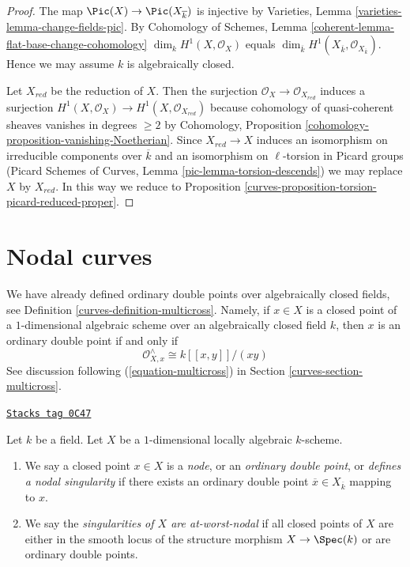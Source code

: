 \begin{proof}

The map $\Pic(X) \to \Pic(X_{\overline{k}})$
is injective by Varieties, Lemma \ref{varieties-lemma-change-fields-pic}.
By Cohomology of Schemes, Lemma \ref{coherent-lemma-flat-base-change-cohomology}
$\dim_k H^1(X, \mathcal{O}_X)$ equals
$\dim_{\overline{k}} H^1(X_{\overline{k}}, \mathcal{O}_{X_{\overline{k}}})$.
Hence we may assume $k$ is algebraically closed.

\medskip\noindent
Let $X_{red}$ be the reduction of $X$. Then the surjection
$\mathcal{O}_X \to \mathcal{O}_{X_{red}}$ induces a surjection
$H^1(X, \mathcal{O}_X) \to H^1(X, \mathcal{O}_{X_{red}})$
because cohomology of quasi-coherent sheaves vanishes in degrees
$\geq 2$ by
Cohomology, Proposition \ref{cohomology-proposition-vanishing-Noetherian}.
Since $X_{red} \to X$ induces an isomorphism on irreducible
components over $\overline{k}$ and an isomorphism on
$\ell$-torsion in Picard groups
(Picard Schemes of Curves, Lemma \ref{pic-lemma-torsion-descends})
we may replace $X$ by $X_{red}$. In this way we reduce to
Proposition \ref{curves-proposition-torsion-picard-reduced-proper}.
\end{proof}

\section{Nodal curves}
\label{curves-section-nodal}
We have already defined ordinary double points over algebraically
closed fields, see Definition \ref{curves-definition-multicross}. Namely,
if $x \in X$ is a closed point of a $1$-dimensional
algebraic scheme over an algebraically closed field $k$, then
$x$ is an ordinary double point if and only if
$$
\mathcal{O}_{X, x}^\wedge \cong k[[x, y]]/(xy)
$$
See discussion following (\ref{equation-multicross}) in
Section \ref{curves-section-multicross}.

\begin{definition}[Nodal]
\label{curves-definition-nodal}
\href{https://stacks.math.columbia.edu/tag/0C47}{\texttt{Stacks tag 0C47}}

Let $k$ be a field. Let $X$ be a $1$-dimensional locally algebraic $k$-scheme.
\begin{enumerate}
\item We say a closed point $x \in X$ is a {\it node}, or an
{\it ordinary double point}, or {\it defines a nodal singularity}
if there exists an ordinary double point $\overline{x} \in X_{\overline{k}}$
mapping to $x$.
\item We say the {\it singularities of $X$ are at-worst-nodal} if
all closed points of $X$ are either in the smooth locus of
the structure morphism $X \to \Spec(k)$ or are ordinary double points.
\end{enumerate}
\end{definition}

